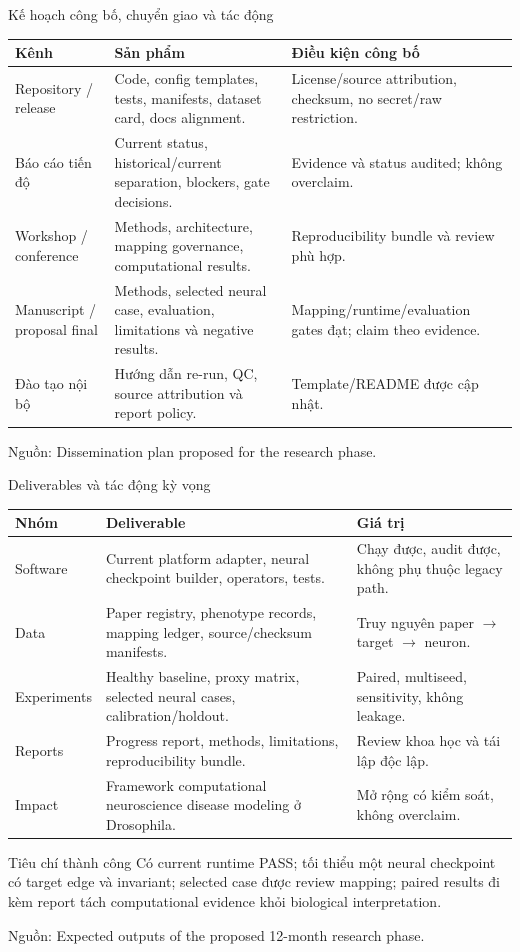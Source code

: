 \documentclass[10pt,aspectratio=169]{beamer}
\newcommand{\source}[1]{\par\vfill{\fontsize{6.0}{7}\selectfont\color{gray}Nguồn: #1\par}}
\newcommand{\smallgap}{\vspace{0.18cm}}
\begin{document}
\begin{frame}{Kế hoạch công bố, chuyển giao và tác động}
\renewcommand{\arraystretch}{1.22}\small
\begin{tabular}{@{}L{3.0cm}L{6.3cm}L{4.4cm}@{}}
\toprule
\textbf{Kênh} & \textbf{Sản phẩm} & \textbf{Điều kiện công bố}\\\midrule
Repository / release & Code, config templates, tests, manifests, dataset card, docs alignment. & License/source attribution, checksum, no secret/raw restriction.\\
Báo cáo tiến độ & Current status, historical/current separation, blockers, gate decisions. & Evidence và status audited; không overclaim.\\
Workshop / conference & Methods, architecture, mapping governance, computational results. & Reproducibility bundle và review phù hợp.\\
Manuscript / proposal final & Methods, selected neural case, evaluation, limitations và negative results. & Mapping/runtime/evaluation gates đạt; claim theo evidence.\\
Đào tạo nội bộ & Hướng dẫn re-run, QC, source attribution và report policy. & Template/README được cập nhật.\\\bottomrule
\end{tabular}
\source{Dissemination plan proposed for the research phase.}
\end{frame}

\begin{frame}{Deliverables và tác động kỳ vọng}
\renewcommand{\arraystretch}{1.24}\scriptsize
\begin{tabular}{@{}L{2.1cm}L{7.4cm}L{4.8cm}@{}}
\toprule
\textbf{Nhóm} & \textbf{Deliverable} & \textbf{Giá trị}\\\midrule
Software & Current platform adapter, neural checkpoint builder, operators, tests. & Chạy được, audit được, không phụ thuộc legacy path.\\
Data & Paper registry, phenotype records, mapping ledger, source/checksum manifests. & Truy nguyên paper $\rightarrow$ target $\rightarrow$ neuron.\\
Experiments & Healthy baseline, proxy matrix, selected neural cases, calibration/holdout. & Paired, multiseed, sensitivity, không leakage.\\
Reports & Progress report, methods, limitations, reproducibility bundle. & Review khoa học và tái lập độc lập.\\
Impact & Framework computational neuroscience disease modeling ở Drosophila. & Mở rộng có kiểm soát, không overclaim.\\\bottomrule
\end{tabular}
\smallgap
\begin{block}{Tiêu chí thành công}
Có current runtime PASS; tối thiểu một neural checkpoint có target edge và invariant; selected case được review mapping; paired results đi kèm report tách computational evidence khỏi biological interpretation.
\end{block}
\source{Expected outputs of the proposed 12-month research phase.}
\end{frame}
\end{document}
